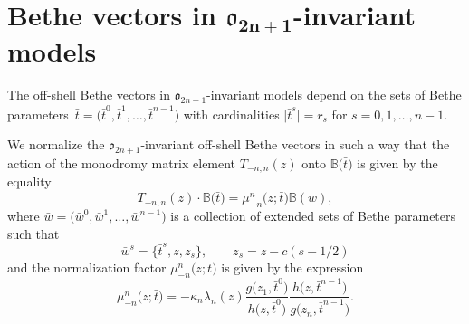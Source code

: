 \documentclass[10pt,a4paper]{amsart}
\newcommand{\bt}{{\bar t}}
\newcommand{\bw}{\bar w}
\theoremstyle{definition}
\def\BB{{\mathbb{B}}}
\begin{document}
\section[Bethe vectors in o\_2n+1-invariant models]{Bethe vectors in $\boldsymbol{\mathfrak{o}_{2n+1}}$-invariant models}\label{sect:oN}

The off-shell Bethe vectors in $\mathfrak{o}_{2n+1}$-invariant models
depend on the sets of Bethe parameters~${\bt=\bigl(\bt^0,\bt^1,\dots,\bt^{n-1}\bigr)}$
with cardinalities $\big|\bt^s\big|=r_s$ for $s=0,1,\dots,n-1$.


We normalize the $\mathfrak{o}_{2n+1}$-invariant off-shell Bethe vectors in such a way
that the action of the monodromy matrix element $T_{-n,n}(z)$ onto
$\BB\bigl(\bt\bigr)$ is given by the equality
\begin{equation}\label{Bz1}
T_{-n,n}(z)\cdot\BB\bigl(\bt\bigr)= \mu_{-n}^n\bigl(z;\bt\bigr) \BB(\bw) ,
\end{equation}
where
$\bw=\bigl(\bw^0,\bw^1,\dots,\bw^{n-1}\bigr)$ is a collection of extended
sets of Bethe parameters such that
\begin{equation}\label{Bz2}
\bw^s=\bigl\{\bt^s,z,z_s\bigr\},\qquad z_s=z-c(s-1/2)
\end{equation}
and the normalization factor $\mu_{-n}^n\bigl(z;\bt\bigr)$ is given by the expression
\begin{equation}\label{Bz3}
\mu_{-n}^n\bigl(z;\bt\bigr)=-\kappa_n \lambda_n(z)
\frac{g\bigl(z_1,\bar t^0\bigr)}{h\bigl(z,\bar t^{0}\bigr)}
\frac{h\bigl(z,\bar t^{n-1}\bigr)}{g\bigl(z_n,\bar t^{n-1}\bigr)} .
\end{equation}
\end{document}
